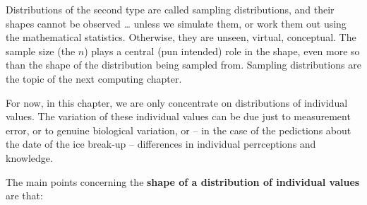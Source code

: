 \documentclass[]{book}
\begin{document}
Distributions of the second type are called sampling distributions, and their shapes cannot be observed \ldots{} unless we simulate them, or work them out using the mathematical statistics. Otherwise, they are unseen, virtual, conceptual. The sample size (the \(n\)) plays a central (pun intended) role in the shape, even more so than the shape of the distribution being sampled from. Sampling distributions are the topic of the next computing chapter.

For now, in this chapter, we are only concentrate on distributions of individual values. The variation of these individual values can be due just to measurement error, or to genuine biological variation, or -- in the case of the pedictions about the date of the ice break-up -- differences in individual perrceptions and knowledge.

The main points concerning the \textbf{shape of a distribution of individual values} are that:
\end{document}

